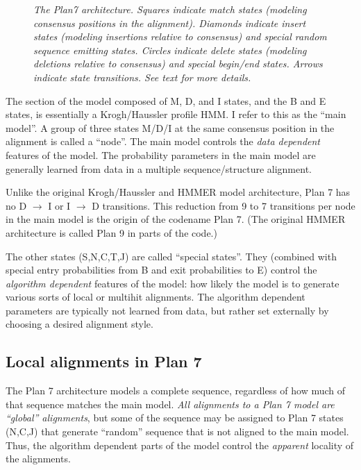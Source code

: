 \documentclass[11pt]{report}
\begin{document}
\begin{figure}
\caption{\textit{The Plan7 architecture. Squares indicate match states
(modeling consensus positions in the alignment). Diamonds indicate
insert states (modeling insertions relative to consensus) and special
random sequence emitting states. Circles indicate delete states
(modeling deletions relative to consensus) and special begin/end
states. Arrows indicate state transitions. See text for more details.}}
\end{figure}

The section of the model composed of M, D, and I states, and the B and
E states, is essentially a Krogh/Haussler profile HMM. I refer to this
as the ``main model''. A group of three states M/D/I at the same
consensus position in the alignment is called a ``node''. The main
model controls the \textit{data dependent} features of the model.  The
probability parameters in the main model are generally learned from
data in a multiple sequence/structure alignment.

Unlike the original Krogh/Haussler and HMMER model architecture, Plan
7 has no D $\rightarrow$ I or I $\rightarrow$ D transitions. This
reduction from 9 to 7 transitions per node in the main model is the
origin of the codename Plan 7. (The original HMMER architecture is
called Plan 9 in parts of the code.)

The other states (S,N,C,T,J) are called ``special states''. They
(combined with special entry probabilities from B and exit
probabilities to E) control the \textit{algorithm dependent} features
of the model: how likely the model is to generate various sorts of
local or multihit alignments. The algorithm dependent parameters are
typically not learned from data, but rather set externally by choosing
a desired alignment style.

\subsection{Local alignments in Plan 7}

The Plan 7 architecture models a complete sequence, regardless of how
much of that sequence matches the main model. \textit{All alignments
to a Plan 7 model are ``global'' alignments}, but some of the sequence
may be assigned to Plan 7 states (N,C,J) that generate ``random''
sequence that is not aligned to the main model.  Thus, the algorithm
dependent parts of the model control the \textit{apparent} locality of
the alignments.
\end{document}
